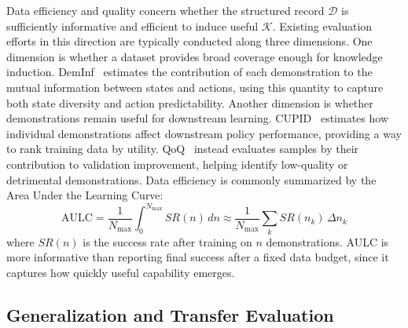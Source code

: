 \documentclass[acmsmall,screen,review]{acmart}
\begin{document}
Data efficiency and quality concern whether the structured record \(\mathcal{D}\) is sufficiently informative and efficient to induce useful \(\mathcal{K}\).
Existing evaluation efforts in this direction are typically conducted along three dimensions.
One dimension is whether a dataset provides broad coverage enough for knowledge induction. 
DemInf~\cite{hejna2025robot} estimates the contribution of each demonstration to the mutual information between states and actions, 
using this quantity to capture both state diversity and action predictability.
Another dimension is whether demonstrations remain useful for downstream learning. 
CUPID~\cite{agia2025cupidcuratingdatarobot} estimates how individual demonstrations affect downstream policy performance, providing a way to rank training data by utility. 
QoQ~\cite{lee2026qoq} instead evaluates samples by their contribution to validation improvement, helping identify low-quality or detrimental demonstrations.
Data efficiency is commonly summarized by the Area Under the Learning Curve:
\begin{equation}
\mathrm{AULC} = \frac{1}{N_{\max}} \int_0^{N_{\max}} SR(n)\, dn
\approx \frac{1}{N_{\max}} \sum_k SR(n_k)\,\Delta n_k
\end{equation}
where $SR(n)$ is the success rate after training on $n$ demonstrations. AULC is more informative than reporting final success after a fixed data budget, since it captures how quickly useful capability emerges.

\subsection{Generalization and Transfer Evaluation}\label{sec:eval_benchmarking}
\end{document}
